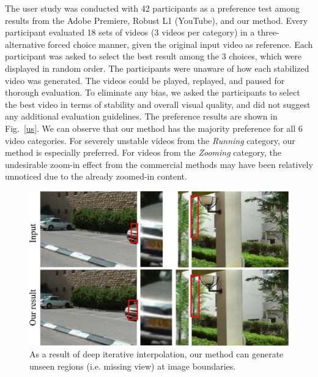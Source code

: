 The user study was conducted with 42 participants as a preference test among results from the Adobe Premiere, Robust L1 (YouTube), and our method.
Every participant evaluated 18 sets of videos (3 videos per category) in a three-alternative forced choice manner, given the original input video as reference. 
Each participant was asked to select the best result among the 3 choices, which were displayed in random order.
The participants were unaware of how each stabilized video was generated. 
The videos could be played, replayed, and paused for thorough evaluation.
To eliminate any bias, we asked the participants to select the best video in terms of stability and overall visual quality, and did not suggest any additional evaluation guidelines.
The preference results are shown in Fig.~\ref{us}.
We can observe that our method has the majority preference for all 6 video categories.
For severely unstable videos from the \emph{Running} category, our method is especially preferred.
For videos from the \emph{Zooming} category, the undesirable zoom-in effect from the commercial methods may have been relatively unnoticed due to the already zoomed-in content.

\begin{figure}
	\includegraphics[width=1\linewidth,keepaspectratio]{unseen}
	\vspace{-5mm}
	\caption{As a result of deep iterative interpolation, our method can generate unseen regions (i.e. missing view) at image boundaries.}
	\label{unseen}
	\vspace{-3mm}
\end{figure}

